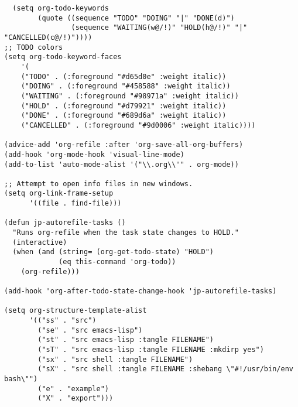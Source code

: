 \documentclass[11pt]{article}
\begin{document}
\begin{verbatim}
  (setq org-todo-keywords
        (quote ((sequence "TODO" "DOING" "|" "DONE(d)")
                (sequence "WAITING(w@/!)" "HOLD(h@/!)" "|" "CANCELLED(c@/!)"))))
;; TODO colors
(setq org-todo-keyword-faces
    '(
    ("TODO" . (:foreground "#d65d0e" :weight italic))
    ("DOING" . (:foreground "#458588" :weight italic))
    ("WAITING" . (:foreground "#98971a" :weight italic))
    ("HOLD" . (:foreground "#d79921" :weight italic))
    ("DONE" . (:foreground "#689d6a" :weight italic))
    ("CANCELLED" . (:foreground "#9d0006" :weight italic))))

(advice-add 'org-refile :after 'org-save-all-org-buffers)
(add-hook 'org-mode-hook 'visual-line-mode)
(add-to-list 'auto-mode-alist '("\\.org\\'" . org-mode))

;; Attempt to open info files in new windows.
(setq org-link-frame-setup
      '((file . find-file)))

(defun jp-autorefile-tasks ()
  "Runs org-refile when the task state changes to HOLD."
  (interactive)
  (when (and (string= (org-get-todo-state) "HOLD")
             (eq this-command 'org-todo))
    (org-refile)))

(add-hook 'org-after-todo-state-change-hook 'jp-autorefile-tasks)

(setq org-structure-template-alist
      '(("ss" . "src")
        ("se" . "src emacs-lisp")
        ("st" . "src emacs-lisp :tangle FILENAME")
        ("sT" . "src emacs-lisp :tangle FILENAME :mkdirp yes")
        ("sx" . "src shell :tangle FILENAME")
        ("sX" . "src shell :tangle FILENAME :shebang \"#!/usr/bin/env bash\"")
        ("e" . "example")
        ("X" . "export")))
\end{verbatim}
\end{document}
